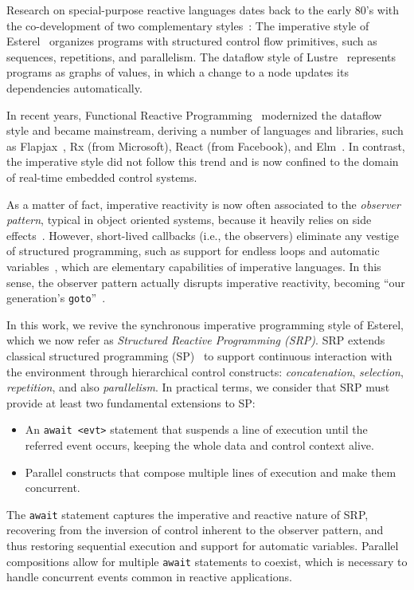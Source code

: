 \documentclass{acm_proc_article-sp}
\newcommand{\code}[1] {{\small{\texttt{#1}}}}
\newcommand{\1}{\;}
\newcommand{\2}{\;\;}
\newcommand{\3}{\;\;\;}
\newcommand{\5}{\;\;\;\;\;}
\begin{document}
Research on special-purpose reactive languages dates back to the early 80's 
with the co-development of two complementary 
styles~\cite{rp.twelve,rp.hypothesis}:
%
The imperative style of Esterel~\cite{esterel.ieee91} organizes programs with 
structured control flow primitives, such as sequences, repetitions, and 
parallelism.
%
The dataflow style of Lustre~\cite{lustre.ieee91} represents programs as graphs 
of values, in which a change to a node updates its dependencies automatically.

In recent years, Functional Reactive Programming~\cite{frp.principles} 
modernized the dataflow style and became mainstream, deriving a number of 
languages and libraries, such as Flapjax~\cite{frp.flapjax}, Rx (from 
Microsoft), React (from Facebook), and Elm~\cite{frp.elm}.
%
In contrast, the imperative style did not follow this trend and is now confined 
to the domain of real-time embedded control systems.

As a matter of fact, imperative reactivity is now often associated to the 
\emph{observer pattern}, typical in object oriented systems, because it heavily 
relies on side effects~\cite{rp.deprecating,rp.rescala}.
%
However, short-lived callbacks (i.e., the observers) eliminate any vestige of 
structured programming, such as support for endless loops and automatic 
variables~\cite{sync_async.cooperative}, which are elementary capabilities of 
imperative languages.
%
In this sense, the observer pattern actually disrupts imperative reactivity, 
becoming ``our generation's \code{goto}''~\cite{dij.goto,rp.goto,elm.goto}.

In this work, we revive the synchronous imperative programming style of 
Esterel, which we now refer as \emph{Structured Reactive Programming (SRP)}.
%
SRP extends classical structured programming (SP)~\cite{dij.notes} to support 
continuous interaction with the environment through hierarchical control 
constructs: \emph{concatenation}, \emph{selection}, \emph{repetition}, and also 
\emph{parallelism}.
%
In practical terms, we consider that SRP must provide at least two fundamental 
extensions to SP:
%
\begin{itemize}
\item An \code{await <evt>} statement that suspends a line of execution until 
the referred event occurs, keeping the whole data and control context alive.
\item Parallel constructs that compose multiple lines of execution and make 
them concurrent.
\end{itemize}
%
The \code{await} statement captures the imperative and reactive nature of SRP, 
recovering from the inversion of control inherent to the observer pattern, and 
thus restoring sequential execution and support for automatic variables.
Parallel compositions allow for multiple \code{await} statements to coexist, 
which is necessary to handle concurrent events common in reactive applications.
\end{document}

